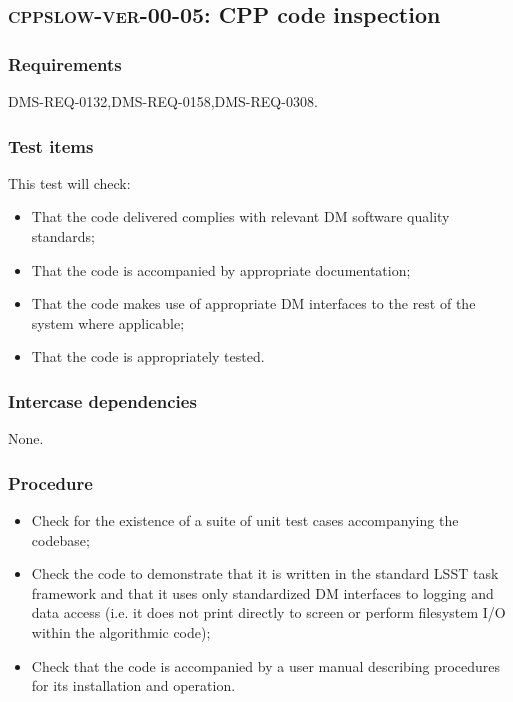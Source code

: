 \subsection{\textsc{cppslow-ver-00-05}: CPP code inspection}
\label{cppslow-ver-00-05}

\subsubsection{Requirements}

DMS-REQ-0132,DMS-REQ-0158,DMS-REQ-0308.

\subsubsection{Test items}

This test will check:

\begin{itemize}

  \item{That the code delivered complies with relevant DM software quality
  standards;}

  \item{That the code is accompanied by appropriate documentation;}

  \item{That the code makes use of appropriate DM interfaces to the rest of
  the system where applicable;}

  \item{That the code is appropriately tested.}
\end{itemize}

\subsubsection{Intercase dependencies}

None.

\subsubsection{Procedure}

\begin{itemize}

  \item{Check for the existence of a suite of unit test cases accompanying the
  codebase;}

  \item{Check the code to demonstrate that it is written in the standard LSST
  task framework and that it uses only standardized DM interfaces to logging
  and data access (i.e. it does not print directly to screen or perform
  filesystem I/O within the algorithmic code);}

  \item{Check that the code is accompanied by a user manual describing
  procedures for its installation and operation.}

\end{itemize}
